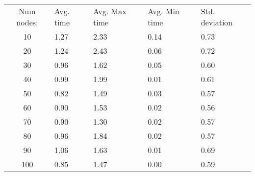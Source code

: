 \begin{tabular}{cllll}
Num nodes: & Avg. time & Avg. Max time & Avg. Min time & Std. deviation \\
10       & 1.27        & 2.33            & 0.14 & 0.73 \\
20       & 1.24        & 2.43            & 0.06 & 0.72 \\
30       & 0.96        & 1.62            & 0.05 & 0.60 \\
40       & 0.99        & 1.99            & 0.01 & 0.61 \\
50       & 0.82        & 1.49            & 0.03 & 0.57 \\
60       & 0.90        & 1.53            & 0.02 & 0.56 \\
70       & 0.90        & 1.30            & 0.02 & 0.57 \\
80       & 0.96        & 1.84            & 0.02 & 0.57 \\
90       & 1.06        & 1.63            & 0.01 & 0.69 \\
100       & 0.85        & 1.47            & 0.00 & 0.59 \\
\end{tabular}